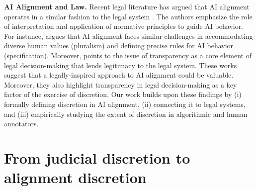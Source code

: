 \documentclass{article}
\begin{document}
\noindent \textbf{AI Alignment and Law.} Recent legal literature has argued that AI alignment operates in a similar fashion to the legal system \cite{caputo2024alignment,abiri2024public,nay2024law}. The authors emphasize the role of interpretation and application of normative principles to guide AI behavior. For instance, \cite{caputo2024alignment} argues that AI alignment faces similar challenges in accommodating diverse human values (pluralism) and defining precise rules for AI behavior (specification). Moreover, \cite{abiri2024public} points to the issue of transparency as a core element of legal decision-making that lends legitimacy to the legal system.
These works suggest that a legally-inspired approach to AI alignment could be valuable. Moreover, they also highlight transparency in legal decision-making as a key factor of the exercise of discretion.
Our work builds upon these findings by (i) formally defining discretion in AI alignment, (ii) connecting it to legal systems, and (iii) empirically studying the extent of discretion in algorithmic and human annotators.

































































\section{From judicial discretion to alignment discretion}\label{sec:law}
\end{document}
